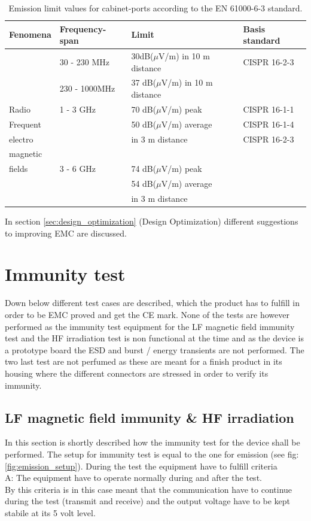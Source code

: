 \begin{table}[H]
		\begin{center}
		\begin{tabular}{|l|l|l|l|}\hline
			Fenomena 	& Frequency-span & Limit & Basis standard\\\hline
			~ 			& 30 - 230 MHz		& 30dB($\mu$V/m) in 10 m distance		& CISPR 16-2-3	\\
			~			& 230 - 1000MHz 	& 37 dB($\mu$V/m) in 10 m distance 	& ~				\\\hline
			Radio		& 1 - 3 GHz		& 70 dB($\mu$V/m) peak				& CISPR 16-1-1	\\
			Frequent		&				& 50 dB($\mu$V/m) average			& CISPR 16-1-4	\\
			electro		&				& in 3 m distance					& CISPR 16-2-3	\\
			magnetic		&				& 								& 				\\
			fields		& 3 - 6 GHz		& 74 dB($\mu$V/m) peak				& 				\\
			~			&				& 54 dB($\mu$V/m) average			& 				\\
			~			&				& in 3 m distance					& 				\\\hline
		\end{tabular}
		\end{center}
	\caption{Emission limit  values for cabinet-ports according to the EN 61000-6-3 standard.}
	\label{table:emission_standard}
\end{table}

In section \ref{sec:design_optimization} (Design Optimization) different suggestions to improving EMC are discussed.

\section{Immunity test}
Down below different test cases are described, which the product has to fulfill in order to be EMC proved and get the CE mark. None of the tests are however performed as the immunity test equipment for the LF magnetic field immunity test and the HF irradiation test is non functional at the time and as the device is a prototype board the ESD and burst / energy transients are not performed. The two last test are not perfumed as these are meant for a finish product in its housing where the different connectors are stressed in order to verify its immunity. 

\subsection{LF magnetic field immunity \& HF irradiation}
In this section is shortly described how the immunity test for the device shall be performed.
\p The setup for immunity test is equal to the one for emission (see fig: \ref{fig:emission_setup}). During the test the equipment have to fulfill criteria \\A: The equipment have to operate normally during and after the test. \\ By this criteria is in this case meant that the communication have to continue during the test (transmit and receive) and the output voltage have to be kept stabile at its 5 volt level.

